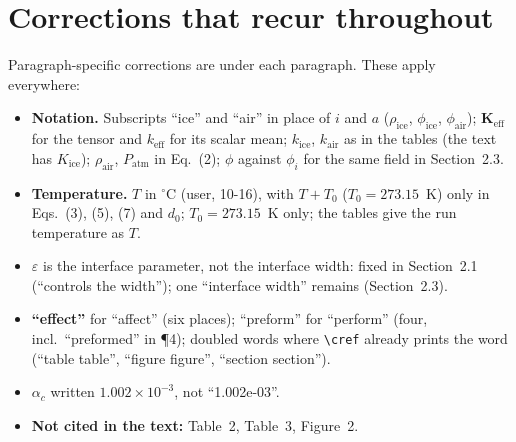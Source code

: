 \documentclass[11pt]{article}
\providecommand{\cref}[1]{\texttt{\detokenize{#1}}}
\begin{document}
\section*{Corrections that recur throughout}
Paragraph-specific corrections are under each paragraph. These apply
everywhere:
\begin{itemize}
\item \textbf{Notation.} Subscripts ``ice'' and ``air'' in place of $i$ and
  $a$ ($\rho_{\mathrm{ice}}$, $\phi_{\mathrm{ice}}$, $\phi_{\mathrm{air}}$);
  $\mathbf{K}_{\mathrm{eff}}$ for the tensor and $k_{\mathrm{eff}}$ for its
  scalar mean; $k_{\mathrm{ice}}$, $k_{\mathrm{air}}$ as in the tables (the
  text has $K_{\mathrm{ice}}$); $\rho_{\mathrm{air}}$, $P_{\mathrm{atm}}$ in
  Eq.~(2); $\phi$ against $\phi_i$ for the same field in Section~2.3.
\item \textbf{Temperature.} $T$ in $^\circ$C (user, 10-16), with
  $T + T_0$ ($T_0 = 273.15$~K) only in Eqs.~(3), (5), (7) and $d_0$;
  $T_0 = 273.15$~K only; the tables give the run temperature as $T$.
\item \textbf{$\varepsilon$} is the interface parameter, not the interface
  width: fixed in Section~2.1 (``controls the width''); one ``interface
  width'' remains (Section~2.3).
\item \textbf{``effect''} for ``affect'' (six places); ``preform'' for
  ``perform'' (four, incl.\ ``preformed'' in \P4); doubled words where \verb|\cref| already prints the
  word (``table table'', ``figure figure'', ``section section'').
\item \textbf{$\alpha_c$} written $1.002\times10^{-3}$, not ``1.002e-03''.
\item \textbf{Not cited in the text:} Table~2, Table~3, Figure~2.
\end{itemize}
\end{document}
